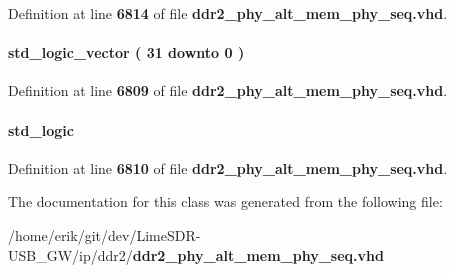 Definition at line {\bf 6814} of file {\bf ddr2\+\_\+phy\+\_\+alt\+\_\+mem\+\_\+phy\+\_\+seq.\+vhd}.

\paragraph[{wdata\+\_\+r}]{ {\bfseries \textcolor{comment}{std\+\_\+logic\+\_\+vector}\textcolor{vhdlchar}{ }\textcolor{vhdlchar}{(}\textcolor{vhdlchar}{ }\textcolor{vhdlchar}{ } \textcolor{vhdldigit}{31} \textcolor{vhdlchar}{ }\textcolor{keywordflow}{downto}\textcolor{vhdlchar}{ }\textcolor{vhdlchar}{ } \textcolor{vhdldigit}{0} \textcolor{vhdlchar}{ }\textcolor{vhdlchar}{)}\textcolor{vhdlchar}{ }} \hspace{0.3cm}{\ttfamily [Signal]}}\label{classddr2__phy__alt__mem__phy__iram__ram_1_1struct_af8fa864ad9bcdfe0b9b96c891cb8d581}


Definition at line {\bf 6809} of file {\bf ddr2\+\_\+phy\+\_\+alt\+\_\+mem\+\_\+phy\+\_\+seq.\+vhd}.

\paragraph[{write\+\_\+r}]{ {\bfseries \textcolor{comment}{std\+\_\+logic}\textcolor{vhdlchar}{ }} \hspace{0.3cm}{\ttfamily [Signal]}}\label{classddr2__phy__alt__mem__phy__iram__ram_1_1struct_aab880121f2481cefe57dda54ac45b144}


Definition at line {\bf 6810} of file {\bf ddr2\+\_\+phy\+\_\+alt\+\_\+mem\+\_\+phy\+\_\+seq.\+vhd}.



The documentation for this class was generated from the following file\+:\begin{DoxyCompactItemize}
\item 
/home/erik/git/dev/\+Lime\+S\+D\+R-\/\+U\+S\+B\+\_\+\+G\+W/ip/ddr2/{\bf ddr2\+\_\+phy\+\_\+alt\+\_\+mem\+\_\+phy\+\_\+seq.\+vhd}\end{DoxyCompactItemize}
